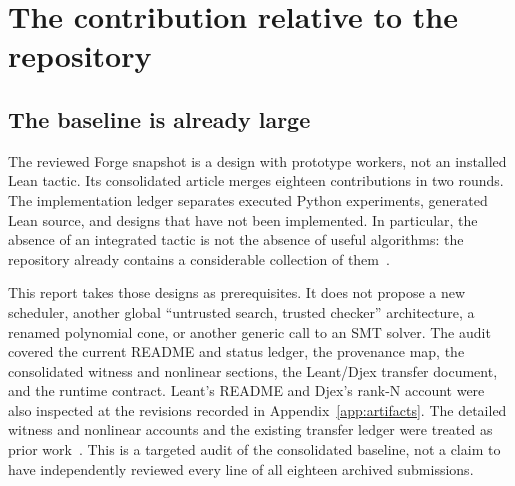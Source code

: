 \section{The contribution relative to the repository}
\label{sec:delta}

\subsection{The baseline is already large}
The reviewed Forge snapshot is a design with prototype workers, not an installed Lean tactic. Its consolidated article merges eighteen contributions in two rounds. The implementation ledger separates executed Python experiments, generated Lean source, and designs that have not been implemented. In particular, the absence of an integrated tactic is not the absence of useful algorithms: the repository already contains a considerable collection of them~\cite{forge-status,forge-provenance}.

This report takes those designs as prerequisites. It does not propose a new scheduler, another global ``untrusted search, trusted checker'' architecture, a renamed polynomial cone, or another generic call to an SMT solver. The audit covered the current README and status ledger, the provenance map, the consolidated witness and nonlinear sections, the Leant/Djex transfer document, and the runtime contract. Leant's README and Djex's rank-N account were also inspected at the revisions recorded in Appendix~\ref{app:artifacts}. The detailed witness and nonlinear accounts and the existing transfer ledger were treated as prior work~\cite{forge-witness,forge-nonlinear,forge-transfer}. This is a targeted audit of the consolidated baseline, not a claim to have independently reviewed every line of all eighteen archived submissions.

